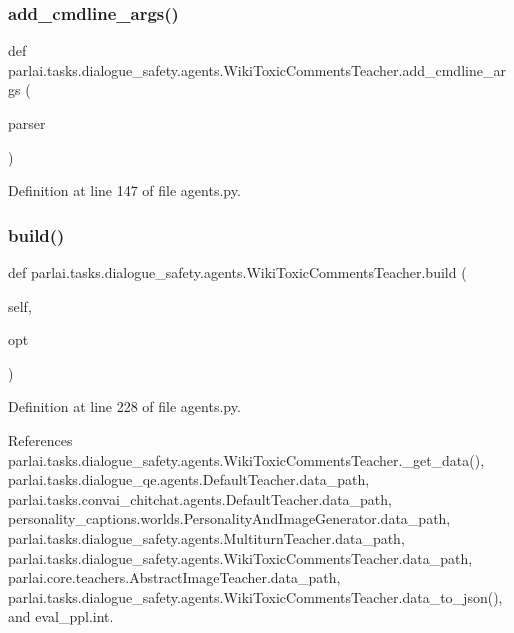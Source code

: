 \subsubsection{\texorpdfstring{add\+\_\+cmdline\+\_\+args()}{add\_cmdline\_args()}}
{\footnotesize\ttfamily def parlai.\+tasks.\+dialogue\+\_\+safety.\+agents.\+Wiki\+Toxic\+Comments\+Teacher.\+add\+\_\+cmdline\+\_\+args (\begin{DoxyParamCaption}\item[{}]{parser }\end{DoxyParamCaption})\hspace{0.3cm}{\ttfamily [static]}}



Definition at line 147 of file agents.\+py.

\mbox{\label{classparlai_1_1tasks_1_1dialogue__safety_1_1agents_1_1WikiToxicCommentsTeacher_acbc5c579a2791af831f6e4f72dc8560c}} 
\subsubsection{\texorpdfstring{build()}{build()}}
{\footnotesize\ttfamily def parlai.\+tasks.\+dialogue\+\_\+safety.\+agents.\+Wiki\+Toxic\+Comments\+Teacher.\+build (\begin{DoxyParamCaption}\item[{}]{self,  }\item[{}]{opt }\end{DoxyParamCaption})}



Definition at line 228 of file agents.\+py.



References parlai.\+tasks.\+dialogue\+\_\+safety.\+agents.\+Wiki\+Toxic\+Comments\+Teacher.\+\_\+get\+\_\+data(), parlai.\+tasks.\+dialogue\+\_\+qe.\+agents.\+Default\+Teacher.\+data\+\_\+path, parlai.\+tasks.\+convai\+\_\+chitchat.\+agents.\+Default\+Teacher.\+data\+\_\+path, personality\+\_\+captions.\+worlds.\+Personality\+And\+Image\+Generator.\+data\+\_\+path, parlai.\+tasks.\+dialogue\+\_\+safety.\+agents.\+Multiturn\+Teacher.\+data\+\_\+path, parlai.\+tasks.\+dialogue\+\_\+safety.\+agents.\+Wiki\+Toxic\+Comments\+Teacher.\+data\+\_\+path, parlai.\+core.\+teachers.\+Abstract\+Image\+Teacher.\+data\+\_\+path, parlai.\+tasks.\+dialogue\+\_\+safety.\+agents.\+Wiki\+Toxic\+Comments\+Teacher.\+data\+\_\+to\+\_\+json(), and eval\+\_\+ppl.\+int.

